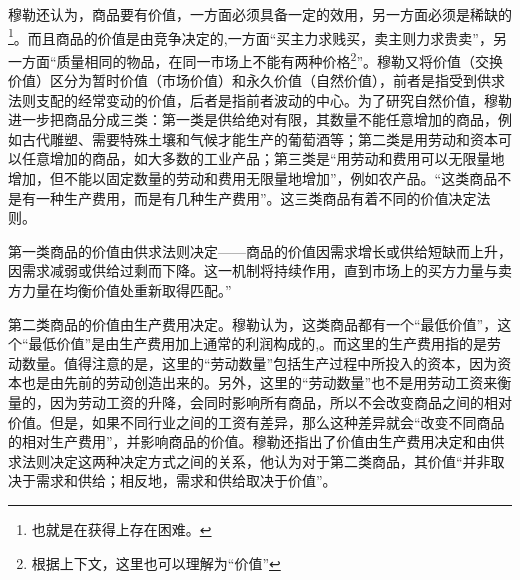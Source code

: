  穆勒还认为，商品要有价值，一方面必须具备一定的效用，另一方面必须是稀缺的\footnote{也就是在获得上存在困难。}\cite[499]{YueHan*MuLeZhengZhiJingJiXueYuanLiJiQiZaiSheHuiZheXueShangDeRuoGanYingYongShangJuan1991}。而且商品的价值是由竞争决定的,一方面“买主力求贱买，卖主则力求贵卖”，另一方面“质量相同的物品，在同一市场上不能有两种价格\footnote{根据上下文，这里也可以理解为“价值”}”\cite[497]{YueHan*MuLeZhengZhiJingJiXueYuanLiJiQiZaiSheHuiZheXueShangDeRuoGanYingYongShangJuan1991}。穆勒又将价值（交换价值）区分为暂时价值（市场价值）和永久价值（自然价值），前者是指受到供求法则支配的经常变动的价值，后者是指前者波动的中心\cite[2]{YueHan*MuLeZhengZhiJingJiXueYuanLiJiQiZaiSheHuiZheXueShangDeRuoGanYingYongXiaJuan1991}。为了研究自然价值，穆勒进一步把商品分成三类：第一类是供给绝对有限，其数量不能任意增加的商品，例如古代雕塑、需要特殊土壤和气候才能生产的葡萄酒等\cite[502]{YueHan*MuLeZhengZhiJingJiXueYuanLiJiQiZaiSheHuiZheXueShangDeRuoGanYingYongShangJuan1991}；第二类是用劳动和资本可以任意增加的商品，如大多数的工业产品\cite[502，532]{YueHan*MuLeZhengZhiJingJiXueYuanLiJiQiZaiSheHuiZheXueShangDeRuoGanYingYongShangJuan1991}；第三类是“用劳动和费用可以无限量地增加，但不能以固定数量的劳动和费用无限量地增加”，例如农产品\cite[502]{YueHan*MuLeZhengZhiJingJiXueYuanLiJiQiZaiSheHuiZheXueShangDeRuoGanYingYongShangJuan1991}。“这类商品不是有一种生产费用，而是有几种生产费用”\cite[532]{YueHan*MuLeZhengZhiJingJiXueYuanLiJiQiZaiSheHuiZheXueShangDeRuoGanYingYongShangJuan1991}。这三类商品有着不同的价值决定法则。

 第一类商品的价值由供求法则决定——商品的价值因需求增长或供给短缺而上升，因需求减弱或供给过剩而下降。这一机制将持续作用，直到市场上的买方力量与卖方力量在均衡价值处重新取得匹配。”\cite[506-507]{YueHan*MuLeZhengZhiJingJiXueYuanLiJiQiZaiSheHuiZheXueShangDeRuoGanYingYongShangJuan1991}

 第二类商品的价值由生产费用决定。穆勒认为，这类商品都有一个“最低价值”，这个“最低价值”是由生产费用加上通常的利润构成的,\cite[510-511]{YueHan*MuLeZhengZhiJingJiXueYuanLiJiQiZaiSheHuiZheXueShangDeRuoGanYingYongShangJuan1991}。而这里的生产费用指的是劳动数量\cite[517]{YueHan*MuLeZhengZhiJingJiXueYuanLiJiQiZaiSheHuiZheXueShangDeRuoGanYingYongShangJuan1991}。值得注意的是，这里的“劳动数量”包括生产过程中所投入的资本，因为资本也是由先前的劳动创造出来的\cite[517]{YueHan*MuLeZhengZhiJingJiXueYuanLiJiQiZaiSheHuiZheXueShangDeRuoGanYingYongShangJuan1991}。另外，这里的“劳动数量”也不是用劳动工资来衡量的，因为劳动工资的升降，会同时影响所有商品，所以不会改变商品之间的相对价值\cite[519-520]{YueHan*MuLeZhengZhiJingJiXueYuanLiJiQiZaiSheHuiZheXueShangDeRuoGanYingYongShangJuan1991}。但是，如果不同行业之间的工资有差异，那么这种差异就会“改变不同商品的相对生产费用”，并影响商品的价值\cite[521]{YueHan*MuLeZhengZhiJingJiXueYuanLiJiQiZaiSheHuiZheXueShangDeRuoGanYingYongShangJuan1991}。穆勒还指出了价值由生产费用决定和由供求法则决定这两种决定方式之间的关系，他认为对于第二类商品，其价值“并非取决于需求和供给；相反地，需求和供给取决于价值”\cite[515]{YueHan*MuLeZhengZhiJingJiXueYuanLiJiQiZaiSheHuiZheXueShangDeRuoGanYingYongShangJuan1991}。

